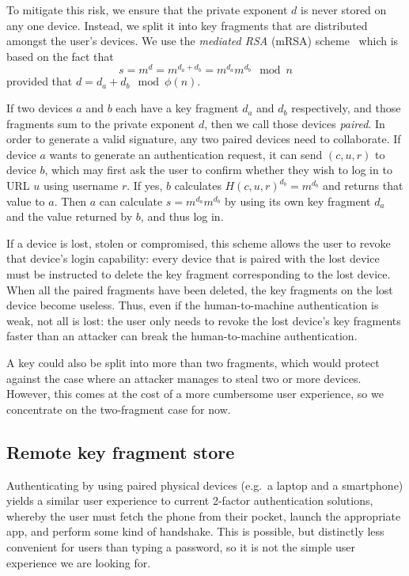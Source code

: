 To mitigate this risk, we ensure that the private exponent $d$ is never stored on any one device.
Instead, we split it into key fragments that are distributed amongst the user's devices. We use the
\emph{mediated RSA} (mRSA) scheme~\cite{Boneh01} which is based on the fact that
$$s = m^d = m^{d_a + d_b} = m^{d_a} m^{d_b} \mod n$$ provided that $d = d_a + d_b \mod \phi(n)$.

If two devices $a$ and $b$ each have a key fragment $d_a$ and $d_b$ respectively, and those
fragments sum to the private exponent $d$, then we call those devices \emph{paired}. In order to
generate a valid signature, any two paired devices need to collaborate. If device $a$ wants to
generate an authentication request, it can send $(c, u, r)$ to device $b$, which may first ask the
user to confirm whether they wish to log in to URL $u$ using username $r$. If yes, $b$ calculates
$H(c, u, r)^{d_b} = m^{d_b}$ and returns that value to $a$. Then $a$ can calculate
$s = m^{d_a} m^{d_b}$ by using its own key fragment $d_a$ and the value returned by $b$, and thus
log in.

If a device is lost, stolen or compromised, this scheme allows the user to revoke that device's
login capability: every device that is paired with the lost device must be instructed to delete the
key fragment corresponding to the lost device. When all the paired fragments have been deleted, the
key fragments on the lost device become useless. Thus, even if the human-to-machine authentication
is weak, not all is lost: the user only needs to revoke the lost device's key fragments faster than
an attacker can break the human-to-machine authentication.

A key could also be split into more than two fragments, which would protect against the case where
an attacker manages to steal two or more devices. However, this comes at the cost of a more
cumbersome user experience, so we concentrate on the two-fragment case for now.

\subsection{Remote key fragment store}

Authenticating by using paired physical devices (e.g.\ a laptop and a smartphone) yields a similar
user experience to current 2-factor authentication solutions, whereby the user must fetch the phone
from their pocket, launch the appropriate app, and perform some kind of handshake. This is
possible, but distinctly less convenient for users than typing a password, so it is not the simple
user experience we are looking for.

